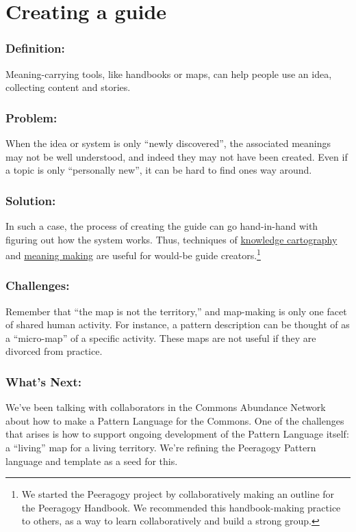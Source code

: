 \section{Creating a guide}
\subsubsection*{Definition:} Meaning-carrying tools, like handbooks or maps, can
help people use an idea, collecting content and stories.

\subsubsection*{Problem:} When the idea or system is only ``newly discovered'',
the associated meanings may not be well understood, and indeed they may
not have been created. Even if a topic is only ``personally new'', it
can be hard to find ones way around.

\subsubsection*{Solution:} In such a case, the process of creating the guide can
go hand-in-hand with figuring out how the system works. Thus, techniques
of \href{http://knowledgecartography.org/}{knowledge cartography}
and \href{http://www.hitl.washington.edu/publications/r-97-47/two.html}{meaning
making} are useful for would-be guide creators.\footnote{We started the Peeragogy project by collaboratively
making an outline for the Peeragogy Handbook. We recommended this
handbook-making practice to others, as a way to learn collaboratively
and build a strong group.}

\subsubsection*{Challenges:} Remember that ``the map is not the territory,'' and
map-making is only one facet of shared human activity. For instance, a
pattern description can be thought of as a ``micro-map'' of a specific
activity. These maps are not useful if they are divorced from practice.

\subsubsection*{What's Next:} We've been talking with collaborators in the
Commons Abundance Network about how to make a Pattern Language for the
Commons. One of the challenges that arises is how to support ongoing
development of the Pattern Language itself: a ``living'' map for a
living territory. We're refining the Peeragogy Pattern language and
template as a seed for this.
